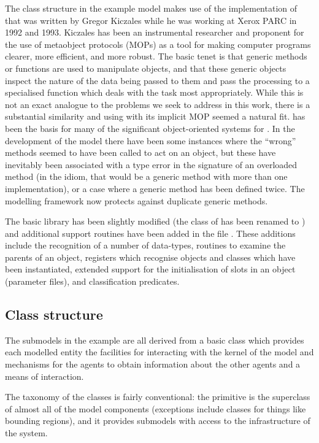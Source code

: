 The class structure in the example model makes use of the \Scheme
implementation of \SCLOS that was written
by Gregor Kiczales \cite{kiczales1993xerox} while he was working at
Xerox PARC in 1992 and 1993.  Kiczales has been an instrumental
researcher and proponent for the use of metaobject protocols (MOPs) as
a tool for making computer programs clearer, more efficient, and more
robust.  The basic tenet is that generic methods or functions are used
to manipulate objects, and that these generic objects inspect the
nature of the data being passed to them and pass the processing to a
specialised function which deals with the task most appropriately.
While this is not an exact analogue to the problems we seek to address
in this work, there is a substantial similarity and using \SCLOS
with its implicit MOP seemed a natural fit.  \SCLOS has been
the basis for many of the significant object-oriented  systems for
\Scheme.  In the development of the model there have been some
instances where the ``wrong'' methods seemed to have been
called to act on an object, but these have inevitably been associated
with a type error in the signature of an overloaded method (in
the \SCLOS idiom, that would be a generic method with more than one
implementation), or a case where a generic method has been defined
twice. The modelling framework now protects against duplicate generic
methods. 

The basic \SCLOS library has been slightly modified
(the  class of \SCLOS has been renamed
to ) and additional support routines have
been added in the file .  These additions
include the recognition of a number of \Scheme data-types, routines to
examine the parents of an object, registers which recognise objects
and classes which have been instantiated, extended support for the
initialisation of slots in an \SCLOS object (parameter files), and
classification predicates.  

\subsection{Class structure}
The submodels in the example are all derived from a basic
 class which provides each modelled entity the
facilities for interacting with the kernel of the model and mechanisms
for the agents to obtain information about the other agents and a
means of interaction.

The taxonomy of the classes is fairly conventional: the primitive
\magent is the superclass of almost all of the model components
(exceptions include classes for things like bounding regions), and it
provides submodels with access to the infrastructure of the system. 

